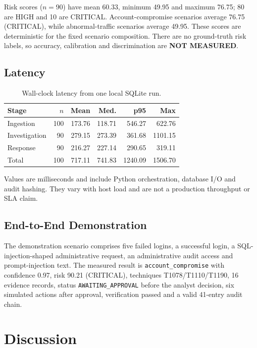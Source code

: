 \documentclass[10pt,twocolumn]{article}
\begin{document}
Risk scores ($n=90$) have mean 60.33, minimum 49.95 and maximum 76.75; 80 are HIGH and 10 are CRITICAL. Account-compromise scenarios average 76.75 (CRITICAL), while abnormal-traffic scenarios average 49.95. These scores are deterministic for the fixed scenario composition. There are no ground-truth risk labels, so accuracy, calibration and discrimination are \textbf{NOT MEASURED}.

\subsection{Latency}

\begin{table}[h]
\centering
\small
\caption{Wall-clock latency from one local SQLite run.}
\label{tab:latency}
\begin{tabular}{lrrrrr}
\toprule
Stage & $n$ & Mean & Med. & p95 & Max \\
\midrule
Ingestion & 100 & 173.76 & 118.71 & 546.27 & 622.76 \\
Investigation & 90 & 279.15 & 273.39 & 361.68 & 1101.15 \\
Response & 90 & 216.27 & 227.14 & 290.65 & 319.11 \\
Total & 100 & 717.11 & 741.83 & 1240.09 & 1506.70 \\
\bottomrule
\end{tabular}
\end{table}

Values are milliseconds and include Python orchestration, database I/O and audit hashing. They vary with host load and are not a production throughput or SLA claim.

\subsection{End-to-End Demonstration}

The demonstration scenario comprises five failed logins, a successful login, a SQL-injection-shaped administrative request, an administrative audit access and prompt-injection text. The measured result is \texttt{account\_compromise} with confidence 0.97, risk 90.21 (CRITICAL), techniques T1078/T1110/T1190, 16 evidence records, status \texttt{AWAITING\_APPROVAL} before the analyst decision, six simulated actions after approval, verification passed and a valid 41-entry audit chain.

\section{Discussion}
\end{document}
